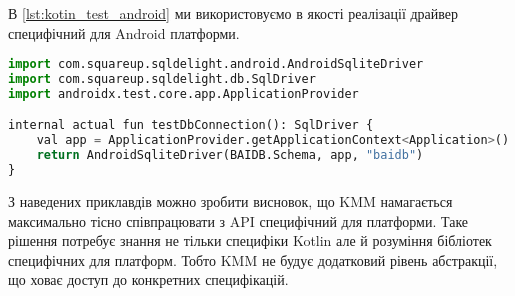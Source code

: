 В \ref{lst:kotin_test_android} ми використовуємо в якості реалізації драйвер специфічний для Android платформи.

\begin{lstlisting}[style=light, language=Python,label={lst:kotin_test_android},caption=Android SQLDriver]
import com.squareup.sqldelight.android.AndroidSqliteDriver
import com.squareup.sqldelight.db.SqlDriver
import androidx.test.core.app.ApplicationProvider

internal actual fun testDbConnection(): SqlDriver {
    val app = ApplicationProvider.getApplicationContext<Application>()
    return AndroidSqliteDriver(BAIDB.Schema, app, "baidb")
}
\end{lstlisting}

З наведених приклавдів можно зробити висновок, що KMM намагається максимально тісно співпрацювати з API специфічний для платформи.
Таке рішення потребує знання не тільки специфіки Kotlin але й розуміння бібліотек специфічних для платформ.
Тобто KMM не будує додатковий рівень абстракції, що ховає доступ до конкретних специфікацій.

